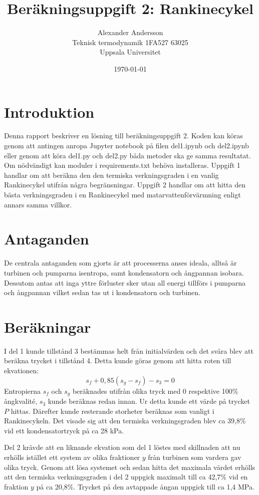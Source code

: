 \documentclass[12pt, a4paper]{article}
\title{Beräkningsuppgift 2: Rankinecykel}
\author{
    Alexander Andersson\\
    Teknisk termodynamik 1FA527 63025\\
    Uppsala Universitet
}
\date{\today}
\begin{document}
\maketitle
\vspace{-25pt}


\section{Introduktion}
\vspace{-5pt}
Denna rapport beskriver en lösning till beräkningsuppgift 2. Koden kan köras
genom att antingen anropa Jupyter notebook på filen del1.ipynb och del2.ipynb eller
genom att köra del1.py och del2.py båda metoder ska ge samma resultatat. Om
nödvändigt kan moduler i requirements.txt behöva installeras.
Uppgift 1 handlar om att beräkna den den termiska verkningsgraden i en vanlig Rankinecykel
utifrån några begränsningar. Uppgift 2 handlar om att hitta den bästa verkningsgraden i en Rankinecykel
med matarvattenförvärmning enligt annars samma villkor.
\section{Antaganden}
\vspace{-5pt}
De centrala antaganden som gjorts är att processerna anses ideala, alltså är turbinen och pumparna
isentropa, samt kondensatorn och ångpannan isobara. Dessutom antas att inga yttre förluster sker
utan all energi tillförs i pumparna och ångpannan vilket sedan tas ut i kondensatorn och turbinen.

\section{Beräkningar}
\vspace{-5pt}
I del 1 kunde tillstånd 3 bestämmas helt från initialvärden och det svåra blev
att beräkna trycket i tillstånd 4. Detta kunde göras genom att hitta roten till ekvationen:
\begin{equation}
    s_f + 0,85(s_g-s_f)- s_3 = 0
\end{equation}
Entropierna $s_f$ och $s_g$ beräknades utifrån olika tryck med 0 respektive
100\% ångkvalité, $s_3$ kunde beräknas redan innan. Ur detta kunde ett värde på trycket $P$ hittas.
Därefter kunde resterande storheter beräknas som vanligt i Rankinecykeln.
Det visade sig att den termiska verkningsgraden blev ca 39,8\% vid ett
kondensatortryck på ca 28 kPa.

Del 2 krävde att en liknande ekvation som del 1 löstes med skillnaden att nu erhölls istället
ett system av olika fraktioner $y$ från turbinen som vardera gav olika tryck. Genom att lösa
systemet och sedan hitta det maximala värdet erhölls att den
termiska verkningsgraden i del 2 uppgick maximalt till ca 42,7\%
vid en fraktion $y$ på ca 20,8\%. Trycket på den avtappade ångan uppgick till ca
1,4 MPa.


%
%
\end{document}
